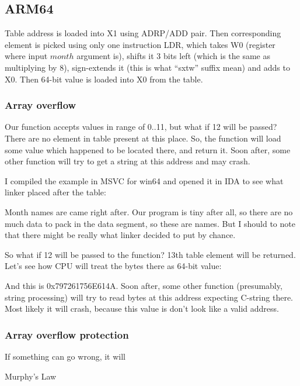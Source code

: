 \subsection{ARM64}



Table address is loaded into X1 using ADRP/ADD pair.
Then corresponding element is picked using only one instruction LDR, which takes W0 
(register where input $month$ argument is), shifts it 3 bits left (which is the same as multiplying by 8), 
sign-extends it (this is what ``sxtw'' suffix mean) and adds to X0.
Then 64-bit value is loaded into X0 from the table.

\subsubsection{Array overflow}

Our function accepts values in range of 0..11, but what if 12 will be passed?
There are no element in table present at this place.
So, the function will load some value which happened to be located there, and return it.
Soon after, some other function will try to get a string at this address and may crash.

I compiled the example in MSVC for win64 and opened it in IDA to see what linker placed after the table:



Month names are came right after.
Our program is tiny after all, so there are no much data to pack in the data segment, so these are names.
But I should to note that there might be really  what linker decided to put by chance.

So what if 12 will be passed to the function?
13th table element will be returned.
Let's see how CPU will treat the bytes there as 64-bit value:



And this is 0x797261756E614A.
Soon after, some other function (presumably, string processing) will try to read bytes at 
this address expecting C-string there.
Most likely it will crash, because this value is don't look like a valid address.

\subsubsection{Array overflow protection}
\epigraph{If something can go wrong, it will}{Murphy's Law}

